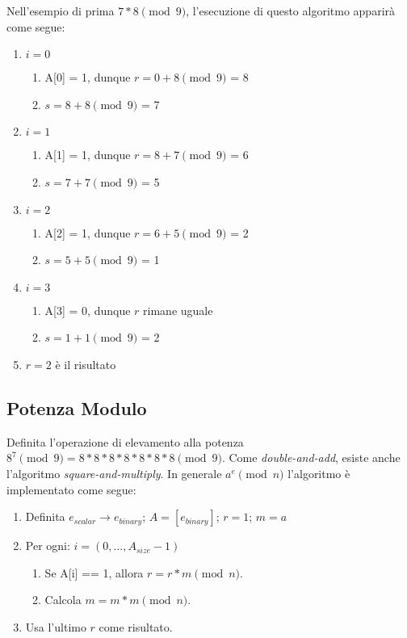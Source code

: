 Nell'esempio di prima $7*8 \pmod 9$, l'esecuzione di questo algoritmo apparirà come segue:
\begin{enumerate}
	\item $i = 0$
	\begin{enumerate}
		\item A[0] = 1, dunque $r = 0 + 8 \pmod 9$ = 8
		\item $s = 8 + 8 \pmod 9$ = 7
	\end{enumerate}
	\item $i = 1$
	\begin{enumerate}
		\item A[1] = 1, dunque $r = 8 + 7 \pmod 9$ = 6
		\item $s = 7 + 7 \pmod 9$ = 5
	\end{enumerate}
	\item $i = 2$
	\begin{enumerate}
		\item A[2] = 1, dunque $r = 6 + 5 \pmod 9$ = 2
		\item $s = 5 + 5 \pmod 9$ = 1
	\end{enumerate}
	\item $i = 3$
	\begin{enumerate}
		\item A[3] = 0, dunque $r$ rimane uguale
		\item $s = 1 + 1 \pmod 9$ = 2
	\end{enumerate}
	\item $r = 2$ è il risultato
\end{enumerate}


\subsection{Potenza Modulo}

Definita l'operazione di elevamento alla potenza $8^7 \pmod 9 = 8*8*8*8*8*8*8 \pmod 9$. Come \emph{double-and-add}, esiste anche l'algoritmo \emph{square-and-multiply}. In generale $a^e \pmod{n}$ l'algoritmo è implementato come segue:
\begin{enumerate}
	\item Definita $e_{scalar} \rightarrow e_{binary}$; $A = [e_{binary}]$; $r = 1$; $m = a$
	\item Per ogni: $i = (0,...,A_{size} - 1)$
	\begin{enumerate}
		\item Se A[i] == 1, allora $r = r * m \pmod n$.
		\item Calcola $m = m * m \pmod n$.
	\end{enumerate}
	\item Usa l'ultimo $r$ come risultato.
\end{enumerate}


